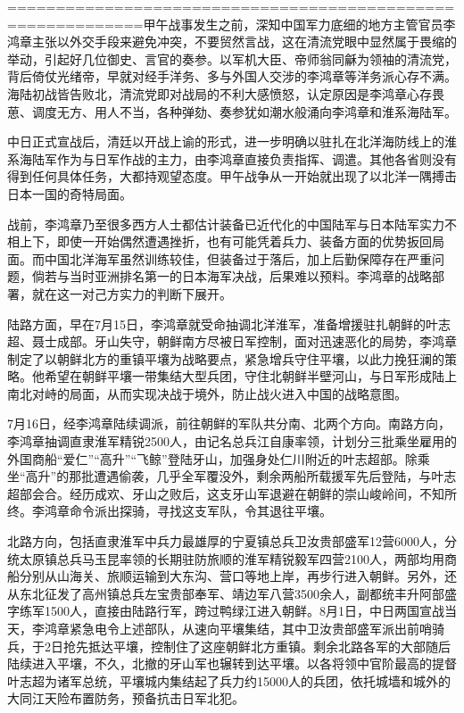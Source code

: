 \documentclass[12pt,UTF8]{ctexbook}
\begin{document}
============================================================甲午战事发生之前，深知中国军力底细的地方主管官员李鸿章主张以外交手段来避免冲突，不要贸然言战，这在清流党眼中显然属于畏缩的举动，引起好几位御史、言官的奏参。以军机大臣、帝师翁同龢为领袖的清流党，背后倚仗光绪帝，早就对经手洋务、多与外国人交涉的李鸿章等洋务派心存不满。海陆初战皆告败北，清流党即对战局的不利大感愤怒，认定原因是李鸿章心存畏葸、调度无方、用人不当，各种弹劾、奏参犹如潮水般涌向李鸿章和淮系海陆军。

中日正式宣战后，清廷以开战上谕的形式，进一步明确以驻扎在北洋海防线上的淮系海陆军作为与日军作战的主力，由李鸿章直接负责指挥、调遣。其他各省则没有得到任何具体任务，大都持观望态度。甲午战争从一开始就出现了以北洋一隅搏击日本一国的奇特局面。

战前，李鸿章乃至很多西方人士都估计装备已近代化的中国陆军与日本陆军实力不相上下，即使一开始偶然遭遇挫折，也有可能凭着兵力、装备方面的优势扳回局面。而中国北洋海军虽然训练较佳，但装备过于落后，加上后勤保障存在严重问题，倘若与当时亚洲排名第一的日本海军决战，后果难以预料。李鸿章的战略部署，就在这一对己方实力的判断下展开。

陆路方面，早在7月15日，李鸿章就受命抽调北洋淮军，准备增援驻扎朝鲜的叶志超、聂士成部。牙山失守，朝鲜南方尽被日军控制，面对迅速恶化的局势，李鸿章制定了以朝鲜北方的重镇平壤为战略要点，紧急增兵守住平壤，以此力挽狂澜的策略。他希望在朝鲜平壤一带集结大型兵团，守住北朝鲜半壁河山，与日军形成陆上南北对峙的局面，从而实现决战于境外，防止战火进入中国的战略意图。

7月16日，经李鸿章陆续调派，前往朝鲜的军队共分南、北两个方向。南路方向，李鸿章抽调直隶淮军精锐2500人，由记名总兵江自康率领，计划分三批乘坐雇用的外国商船“爱仁”“高升”“飞鲸”登陆牙山，加强身处仁川附近的叶志超部。除乘坐“高升”的那批遭遇偷袭，几乎全军覆没外，剩余两船所载援军先后登陆，与叶志超部会合。经历成欢、牙山之败后，这支牙山军退避在朝鲜的崇山峻岭间，不知所终。李鸿章命令派出探骑，寻找这支军队，令其退往平壤。

北路方向，包括直隶淮军中兵力最雄厚的宁夏镇总兵卫汝贵部盛军12营6000人，分统太原镇总兵马玉昆率领的长期驻防旅顺的淮军精锐毅军四营2100人，两部均用商船分别从山海关、旅顺运输到大东沟、营口等地上岸，再步行进入朝鲜。另外，还从东北征发了高州镇总兵左宝贵部奉军、靖边军八营3500余人，副都统丰升阿部盛字练军1500人，直接由陆路行军，跨过鸭绿江进入朝鲜。8月1日，中日两国宣战当天，李鸿章紧急电令上述部队，从速向平壤集结，其中卫汝贵部盛军派出前哨骑兵，于2日抢先抵达平壤，控制住了这座朝鲜北方重镇。剩余北路各军的大部随后陆续进入平壤，不久，北撤的牙山军也辗转到达平壤。以各将领中官阶最高的提督叶志超为诸军总统，平壤城内集结起了兵力约15000人的兵团，依托城墙和城外的大同江天险布置防务，预备抗击日军北犯。
\end{document}
